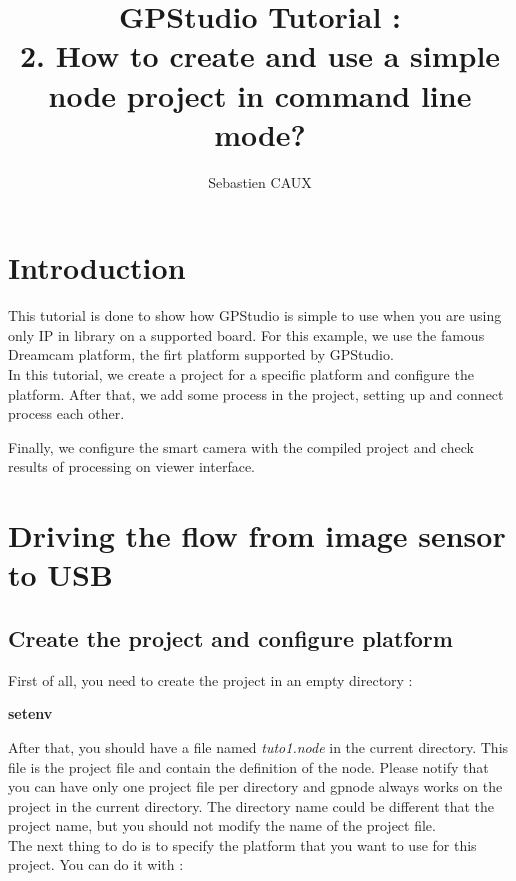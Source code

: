 \documentclass[10pt,a4paper]{article}
\author{Sebastien CAUX}
\title{GPStudio Tutorial \version : \\ 2. How to create and use a simple node project in command line mode?}
\begin{document}
\maketitle
\section{Introduction}
This tutorial is done to show how GPStudio is simple to use when you are using only IP in library on a supported board. For this example, we use the famous Dreamcam platform, the firt platform supported by GPStudio.\\

In this tutorial, we create a project for a specific platform and configure the platform. After that, we add some process in the project, setting up and connect process each other.

Finally, we configure the smart camera with the compiled project and check results of processing on viewer interface.

\section{Driving the flow from image sensor to USB}
\subsection{Create the project and configure platform}
First of all, you need to create the project in an empty directory :

\textbf{setenv}\\


After that, you should have a file named \emph{tuto1.node} in the current directory. This file is the project file and contain the definition of the node. Please notify that you can have only one project file per directory and gpnode always works on the project in the current directory. The directory name could be different that the project name, but you should not modify the name of the project file.\\

The next thing to do is to specify the platform that you want to use for this project. You can do it with :

\end{document}
